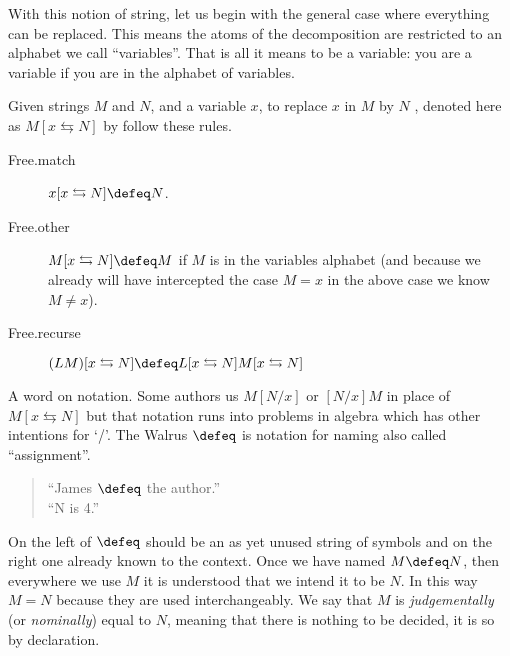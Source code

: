 With this notion of string, let us begin with the general case where everything 
can be replaced.  This means the atoms of the decomposition are restricted to an
alphabet we call ``variables''. That is all it means to be a variable: you are a
variable if you are in the alphabet of variables.  

\begin{definition}
    Given strings $M$ and $N$, and a variable $x$, to replace $x$ in $M$ by $N$ ,
    denoted here as $M[x\leftrightarrows N]$ by follow these rules.
    \begin{description}
        \item[Free.match] $x[x\leftrightarrows N]\defeq N$.
        \item[Free.other] $M[x\leftrightarrows N]\defeq M$ if $M$ is in the variables alphabet (and 
        because we already will have intercepted the case $M=x$ in the above case we know $M\neq x$).
        
        \item[Free.recurse] $(LM)[x\leftrightarrows N]\defeq L[x\leftrightarrows N]M[x\leftrightarrows N]$
    \end{description}
\end{definition}

A word on notation.  Some authors us $M[N/x]$ or $[N/x]M$ in place of $M[x\leftrightarrows N]$
but that notation runs into problems in algebra which has other intentions for `/'.
The Walrus $\defeq$ is notation for naming also called ``assignment''.
\begin{quote}
    ``James $\defeq$ the author.''\\
    ``N is 4.''
\end{quote}
On the left of $\defeq$ should be an as yet unused string of symbols and on the right 
one already known to the context.  Once we have named $M\defeq N$, then 
everywhere we use $M$ it is understood that we intend it to be $N$.
In this way $M=N$ because they are used interchangeably.  We say that 
$M$ is \emph{judgementally} (or \emph{nominally}) equal to $N$, meaning that there is 
nothing to be decided, it is so by declaration.

